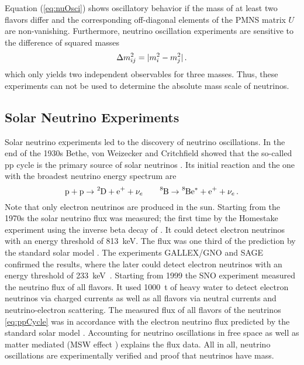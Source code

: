 Equation (\ref{eq:nuOsci}) shows oscillatory behavior if the mass of at least two flavors differ and the corresponding off-diagonal elements of the PMNS matrix $U$ are non-vanishing. Furthermore, neutrino oscillation experiments are sensitive to the difference of squared masses 
\begin{equation}
    \label{eq:massSquaredDiff}
    \Delta m^2_{ij} =  \lvert m^2_i - m^2_j\rvert \text{\,.}
\end{equation}
which only yields two independent observables for three masses. Thus, these experiments can not be used to determine the absolute mass scale of neutrinos.

\subsection{Solar Neutrino Experiments}
Solar neutrino experiments led to the discovery of neutrino oscillations. In the end of the 1930s Bethe, von Weizecker and Critchfield showed that the so-called pp cycle is the primary source of solar neutrinos \cite{Weiz1938, Bethe38, Bethe39}. Its initial reaction and the one with the broadest neutrino energy spectrum are
\begin{equation}
    \ce{p} + \ce{p} \rightarrow \ce{^2D} + \ce{e^+} + \nu_e
    \qquad
    \ce{^8B} \rightarrow \ce{^8Be^*} + \ce{e^+} + \nu_e \fullstop
    \label{eq:ppCycle}
\end{equation}
Note that only electron neutrinos are produced in the sun. Starting from the 1970s the solar neutrino flux was measured; the first time by the Homestake experiment using the inverse beta decay of . It could detect electron neutrinos with an energy threshold of \SI{813}{keV}. The flux was one third of the prediction by the standard solar model \cite{Cleveland1998}. The experiments GALLEX/GNO and SAGE confirmed the results, where the later could detect electron neutrinos with an energy threshold of \SI{233}{keV}~\cite{Kirsten1998, Altmann2005, Abdurashitov2009}. Starting from 1999 the SNO experiment measured the neutrino flux of all flavors. It used \SI{1000}{t} of heavy water  to detect electron neutrinos via charged currents as well as all flavors via neutral currents and neutrino-electron scattering. The measured flux of all flavors of the  neutrinos \eqref{eq:ppCycle} was in accordance with the electron neutrino flux predicted by the standard solar model \cite{Aharmim2013}. Accounting for neutrino oscillations in free space as well as matter mediated (MSW effect \cite{Wolfenstein1977, Mikheev1986}) explains the flux data. All in all, neutrino oscillations are experimentally verified and proof that neutrinos have mass.

